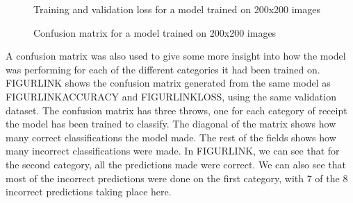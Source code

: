 \begin{figure}[h]
    \caption{Training and validation loss for a model trained on 200x200 images}
    \label{fig:figure3.2}
\end{figure}

\begin{figure}[h]
    \caption{Confusion matrix for a model trained on 200x200 images}
    \label{fig:figure3.2}
\end{figure}

A confusion matrix was also used to give some more insight into how the model was performing for each of the different categories it had been trained on.
FIGURLINK shows the confusion matrix generated from the same model as FIGURLINKACCURACY and FIGURLINKLOSS, using the same validation dataset.
The confusion matrix has three throws, one for each category of receipt the model has been trained to classify.
The diagonal of the matrix shows how many correct classifications the model made.
The rest of the fields shows how many incorrect classifications were made.
In FIGURLINK, we can see that for the second category, all the predictions made were correct.
We can also see that most of the incorrect predictions were done on the first category, with 7 of the 8 incorrect predictions taking place here.

